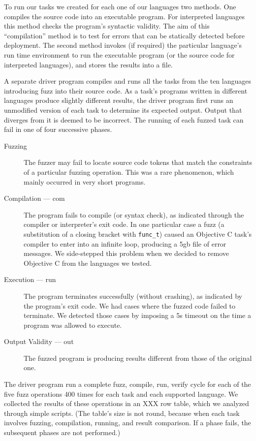 \documentclass[10pt]{sigplanconf}
\begin{document}
To run our tasks we created for each one of our languages two methods.
One compiles the source code into an executable program.
For interpreted languages this method checks the program's syntactic validity.
The aim of this ``compilation'' method is to test for errors that can
be statically detected before deployment.
The second method invokes (if required) the particular language's
run time environment to run the executable program
(or the source code for interpreted languages),
and stores the results into a file.

A separate driver program compiles and runs all the tasks from the ten
languages introducing fuzz into their source code.
As a task's programs written in different languages produce slightly
different results,
the driver program first runs an unmodified version of each task
to determine its expected output.
Output that diverges from it is deemed to be incorrect.
The running of each fuzzed task can fail in one of four successive
phases.
\begin{description}
\item[Fuzzing]
The fuzzer may fail to locate source code tokens that match the
constraints of a particular fuzzing operation.
This was a rare phenomenon, which mainly occurred in very short programs.
\item[Compilation --- com]
The program fails to compile (or syntax check),
as indicated through the compiler or interpreter's exit code.
In one particular case a fuzz
(a substitution of a closing bracket with {\tt func\_t})
caused an Objective C task's compiler
to enter into an infinite loop,
producing a 5{\sc gb} file of error messages.
We side-stepped this problem when we decided to remove Objective C from
the languages we tested.
\item[Execution --- run]
The program terminates successfully (without crashing),
as indicated by the program's exit code.
We had cases where the fuzzed code failed to terminate.
We detected those cases by imposing a 5s timeout on the time a program
was allowed to execute.
\item[Output Validity --- out]
The fuzzed program is producing results different from those of
the original one.
\end{description}

The driver program run a complete fuzz, compile, run, verify cycle
for each of the five fuzz operations 400 times for
each task and each supported language.
We collected the results of these operations in an XXX row table,
which we analyzed through simple scripts.
(The table's size is not round, because when each task involves
fuzzing, compilation, running, and result comparison.
If a phase fails, the subsequent phases are not performed.)
\end{document}
